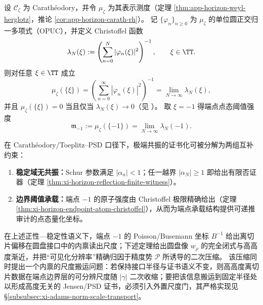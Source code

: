 \begin{theorem}\label{thm:xi-horizon-endpoint-atom-christoffel}
设 \(\mathscr{C}_{\zeta}\) 为 Carath\'eodory，并令 \(\mu_{\zeta}\) 为其表示测度（定理 \ref{thm:app-horizon-weyl-herglotz}，推论 \ref{cor:app-horizon-carath-rh}）。
记 \(\{\varphi_n\}_{n\ge 0}\) 为 \(\mu_{\zeta}\) 的单位圆正交归一多项式（OPUC），并定义 Christoffel 函数
\[
\lambda_N(\xi):=\left(\sum_{n=0}^{N}|\varphi_n(\xi)|^2\right)^{-1},\qquad \xi\in\TT.
\]
则对任意 \(\xi\in\TT\) 成立
\[
\mu_{\zeta}(\{\xi\})
=\left(\sum_{n=0}^{\infty}|\varphi_n(\xi)|^2\right)^{-1}
=\lim_{N\to\infty}\lambda_N(\xi),
\]
并且 \(\mu_{\zeta}(\{\xi\})=0\) 当且仅当 \(\lambda_N(\xi)\to 0\)（见 \cite{Simon2005OPUC1}）。
取 \(\xi=-1\) 得端点点态阈值强度
\[
\mathfrak m_{-1}:=\mu_{\zeta}(\{-1\})=\lim_{N\to\infty}\lambda_N(-1).
\]
\end{theorem}

\begin{corollary}\label{cor:xi-horizon-extreme-resonance-two-stage}
在 Carath\'eodory/Toeplitz--PSD 口径下，极端共振的证书化可被分解为两组互补约束：
\begin{enumerate}
  \item \textbf{稳定域无共振：}Schur 参数满足 \(|\alpha_n|<1\)；任一越界 \(|\alpha_N|\ge 1\) 即给出有限否证器（定理 \ref{thm:xi-horizon-reflection-finite-witness}）。
  \item \textbf{边界阈值承载：}端点 \(-1\) 的原子强度由 Christoffel 极限精确给出（定理 \ref{thm:xi-horizon-endpoint-atom-christoffel}），从而为端点承载结构提供可递推审计的点态量化坐标。
\end{enumerate}
\end{corollary}

在上述正性—稳定性语义下，端点 \(-1\) 的 Poisson/Busemann 坐标 \(B^{-1}\) 给出离切片偏移在圆盘接口中的内禀读出尺度；下述定理给出圆盘像 \(w_\rho\) 的完全闭式与高高度渐近，并把“可见化分辨率”精确归因于精度势 \(\mathcal{P}\) 所诱导的二次压缩。
该压缩同时提出一个内禀的尺度搬运问题：若保持接口半径与证书语义不变，则高高度离切片数据在端点边界层的可分辨尺度随 \(|\gamma|\) 二次收缩；要把该信息搬运到固定半径处以形成高度无关的 Jensen/PSD 证书，必须引入外置尺度门，其严格实现见 \S\ref{subsubsec:xi-adams-norm-scale-transport}。

